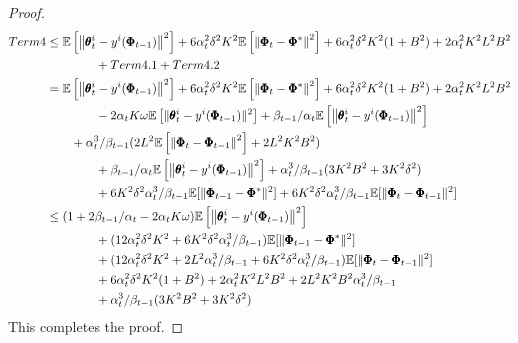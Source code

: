 \documentclass{article} %
\theoremstyle{plain}
\theoremstyle{definition}
\theoremstyle{remark}
\begin{document}
{\begin{proof}
\begin{align}
    \textnormal{Term 4}&\leq \mathbb{E}\left[\left\|\pmb{\theta}_{t}^i-y^i(\pmb{\Phi}_{t-1})\right\|^2\right]+6\alpha_t^2\delta^2K^2\mathbb{E}\left[\left\|\pmb{\Phi}_t-\pmb{\Phi}^*\right\|^2\right]+6\alpha_t^2\delta^2K^2(1+B^2)+2\alpha_t^2K^2L^2B^2\nonumber\allowdisplaybreaks\\
    &\qquad\qquad+ \textnormal{Term 4.1}+\textnormal{Term 4.2}\nonumber\allowdisplaybreaks\\
    &=\mathbb{E}\left[\left\|\pmb{\theta}_{t}^i-y^i(\pmb{\Phi}_{t-1})\right\|^2\right]+6\alpha_t^2\delta^2K^2\mathbb{E}\left[\left\|\pmb{\Phi}_t-\pmb{\Phi}^*\right\|^2\right]+6\alpha_t^2\delta^2K^2(1+B^2)+2\alpha_t^2K^2L^2B^2\nonumber\allowdisplaybreaks\\
    &\qquad\qquad-2\alpha_tK\omega\mathbb{E}\left[\|\pmb{\theta}_t^i-y^i(\pmb{\Phi}_{t-1})\|^2\right]+\beta_{t-1}/\alpha_t\mathbb{E}\left[\left\|\pmb{\theta}_{t}^i-y^i(\pmb{\Phi}_{t-1})\right\|^2 \right]\nonumber\allowdisplaybreaks\\
    &\qquad+\alpha_t^3/\beta_{t-1}(2L^2\mathbb{E}\left[\left\|\pmb{\Phi}_t-\pmb{\Phi}_{t-1}\right\|^2\right]+2L^2K^2B^2)\nonumber\allowdisplaybreaks\\
    &\qquad\qquad+\beta_{t-1}/\alpha_t\mathbb{E}\left[\left\|\pmb{\theta}_{t}^i-y^i(\pmb{\Phi}_{t-1})\right\|^2 \right]+\alpha_t^3/\beta_{t-1}(3K^2B^2+3K^2\delta^2)\nonumber\allowdisplaybreaks\\
    &\qquad\qquad+6K^2\delta^2\alpha_t^3/\beta_{t-1}\mathbb{E}[\|\pmb{\Phi}_{t-1}-\pmb{\Phi}^*\|^2]+6K^2\delta^2\alpha_t^3/\beta_{t-1}\mathbb{E}[\|\pmb{\Phi}_{t}-\pmb{\Phi}_{t-1}\|^2]\nonumber\allowdisplaybreaks\\
    &\leq (1+2\beta_{t-1}/\alpha_t-2\alpha_tK\omega)\mathbb{E}\left[\left\|\pmb{\theta}_{t}^i-y^i(\pmb{\Phi}_{t-1})\right\|^2 \right]\nonumber\allowdisplaybreaks\\
    &\qquad\qquad+(12\alpha_t^2\delta^2K^2+6K^2\delta^2\alpha_t^3/\beta_{t-1})\mathbb{E}[\|\pmb{\Phi}_{t-1}-\pmb{\Phi}^*\|^2]\nonumber\allowdisplaybreaks\\
    &\qquad\qquad +(12\alpha_t^2\delta^2K^2+2L^2\alpha_t^3/\beta_{t-1}+6K^2\delta^2\alpha_t^3/\beta_{t-1})\mathbb{E}[\|\pmb{\Phi}_{t}-\pmb{\Phi}_{t-1}\|^2]\nonumber\allowdisplaybreaks\\
    &\qquad\qquad+6\alpha_t^2\delta^2K^2(1+B^2)+2\alpha_t^2K^2L^2B^2+2L^2K^2B^2\alpha_t^3/\beta_{t-1}\nonumber\allowdisplaybreaks\\
    &\qquad\qquad+\alpha_t^3/\beta_{t-1}(3K^2B^2+3K^2\delta^2)
\end{align}
This completes the proof.
\end{proof}


}
\end{document}
